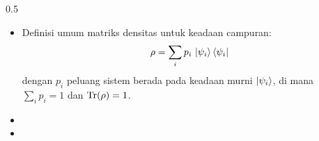 \begin{frame}
\begin{columns}[T]
        \begin{column}{0.5\textwidth}
            \vspace{0.4cm}
            \begin{itemize}\tiny
                \item[]\justifying Definisi umum matriks densitas untuk
                    keadaan campuran:
                    \begin{equation}
                        \rho=\sum_i p_i\,\ket{\psi_i}\bra{\psi_i}
                        \label{eq:matriks-densitas}
                    \end{equation}
                    dengan $p_i$ peluang sistem berada pada keadaan murni
                    $\ket{\psi_i}$, di mana $\sum_i p_i=1$ dan
                    $\operatorname{Tr}(\rho)=1$.
                \item[]\vspace{0.2cm}
                \item[]
            \end{itemize}
        \end{column}
    \end{columns}
\end{frame}

